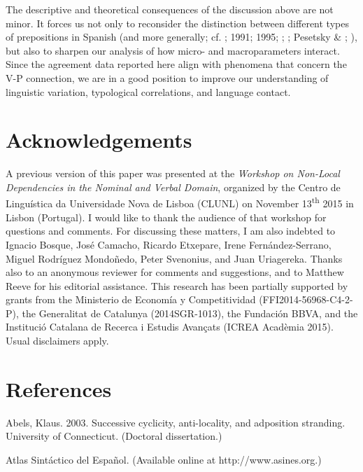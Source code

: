 \documentclass[output=paper]{langsci/langscibook}
\begin{document}
\begin{styleHTMLPreformatted}
The descriptive and theoretical consequences of the discussion above are not minor. It forces us not only to reconsider the distinction between different types of prepositions in Spanish (and more generally; cf. \citealt{Demonte1987}; 1991; 1995; \citealt{Abels2003}; \citealt{Cuervo2003}; Pesetsky \& \citealt{Torrego2004}; \citealt{Romero2011}), but also to sharpen our analysis of how micro- and macroparameters interact. Since the agreement data reported here align with phenomena that concern the V-P connection, we are in a good position to improve our understanding of linguistic variation, typological correlations, and language contact.
\end{styleHTMLPreformatted}

\section{ Acknowledgements}

\begin{styleHTMLPreformatted}
A previous version of this paper was presented at the \textit{Workshop on Non-Local Dependencies in the Nominal and Verbal Domain}, organized by the Centro de Linguística da Universidade Nova de Lisboa (CLUNL) on November 13\textsuperscript{th} 2015 in Lisbon (Portugal). I would like to thank the audience of that workshop for questions and comments. For discussing these matters, I am also indebted to Ignacio Bosque, José Camacho, Ricardo Etxepare, Irene Fernández-Serrano, Miguel Rodríguez Mondoñedo, Peter Svenonius, and Juan Uriagereka. Thanks also to an anonymous reviewer for comments and suggestions, and to Matthew Reeve for his editorial assistance. This research has been partially supported by grants from the Ministerio de Economía y Competitividad (FFI2014-56968-C4-2-P), the Generalitat de Catalunya (2014SGR-1013), the Fundación BBVA, and the Institució Catalana de Recerca i Estudis Avançats (ICREA Acadèmia 2015). Usual disclaimers apply.
\end{styleHTMLPreformatted}

\section{ References}

Abels, Klaus. 2003. Successive cyclicity, anti-locality, and adposition stranding. University of Connecticut. (Doctoral dissertation.)

Atlas Sintáctico del Español. (Available online at http://www.asines.org.)
\end{document}
